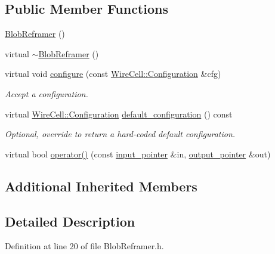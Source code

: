 \subsection*{Public Member Functions}
\begin{DoxyCompactItemize}
\item 
\hyperlink{class_wire_cell_1_1_img_1_1_blob_reframer_a0a9b6c108947b7bb63c04412be62d743}{Blob\+Reframer} ()
\item 
virtual \hyperlink{class_wire_cell_1_1_img_1_1_blob_reframer_a6cc805ac791b1e2a181be4e747cebef5}{$\sim$\+Blob\+Reframer} ()
\item 
virtual void \hyperlink{class_wire_cell_1_1_img_1_1_blob_reframer_ac5a28390b777dfb3d7a4b965c9595153}{configure} (const \hyperlink{namespace_wire_cell_a9f705541fc1d46c608b3d32c182333ee}{Wire\+Cell\+::\+Configuration} \&cfg)
\begin{DoxyCompactList}\small\item\em Accept a configuration. \end{DoxyCompactList}\item 
virtual \hyperlink{namespace_wire_cell_a9f705541fc1d46c608b3d32c182333ee}{Wire\+Cell\+::\+Configuration} \hyperlink{class_wire_cell_1_1_img_1_1_blob_reframer_ab01110630ea376303b88a39d03cc66ee}{default\+\_\+configuration} () const
\begin{DoxyCompactList}\small\item\em Optional, override to return a hard-\/coded default configuration. \end{DoxyCompactList}\item 
virtual bool \hyperlink{class_wire_cell_1_1_img_1_1_blob_reframer_acafad20831aee70abbcd8acb310c4bf2}{operator()} (const \hyperlink{class_wire_cell_1_1_i_function_node_a55c0946156df9b712b8ad1a0b59b2db6}{input\+\_\+pointer} \&in, \hyperlink{class_wire_cell_1_1_i_function_node_afc02f1ec60d31aacddf64963f9ca650b}{output\+\_\+pointer} \&out)
\end{DoxyCompactItemize}
\subsection*{Additional Inherited Members}


\subsection{Detailed Description}


Definition at line 20 of file Blob\+Reframer.\+h.



